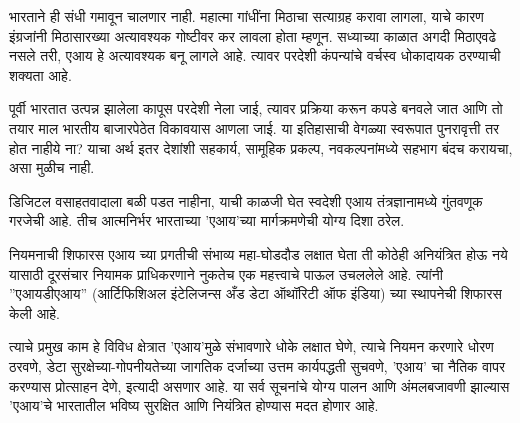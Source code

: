 भारताने ही संधी गमावून चालणार नाही. महात्मा गांधींना मिठाचा सत्याग्रह करावा लागला, याचे कारण इंग्रजांनी मिठासारख्या अत्यावश्यक गोष्टीवर कर लावला होता म्हणून. सध्याच्या काळात अगदी मिठाएवढे नसले तरी, एआय हे अत्यावश्यक बनू लागले आहे. त्यावर परदेशी कंपन्यांचे वर्चस्व धोकादायक ठरण्याची शक्यता आहे.

पूर्वी भारतात उत्पन्न झालेला कापूस परदेशी नेला जाई, त्यावर प्रक्रिया करून कपडे बनवले जात आणि तो तयार माल भारतीय बाजारपेठेत विकावयास आणला जाई. या इतिहासाची वेगळ्या स्वरूपात पुनरावृत्ती तर होत नाहीये ना? याचा अर्थ इतर देशांशी सहकार्य, सामूहिक प्रकल्प, नवकल्पनांमध्ये सहभाग बंदच करायचा, असा मुळीच नाही.

डिजिटल वसाहतवादाला बळी पडत नाहीना, याची काळजी घेत स्वदेशी एआय तंत्रज्ञानामध्ये गुंतवणूक गरजेची आहे. तीच आत्मनिर्भर भारताच्या 'एआय'च्या मार्गक्रमणेची योग्य दिशा ठरेल.

नियमनाची शिफारस
एआय च्या प्रगतीची संभाव्य महा-घोडदौड लक्षात घेता ती कोठेही अनियंत्रित होऊ नये यासाठी दूरसंचार नियामक प्राधिकरणाने नुकतेच एक महत्त्वाचे पाऊल उचललेले आहे. त्यांनी ''एआयडीएआय'' (आर्टिफिशिअल इंटेलिजन्स अँड डेटा ऑथॉरिटी ऑफ इंडिया) च्या स्थापनेची शिफारस केली आहे.

त्याचे प्रमुख काम हे विविध क्षेत्रात 'एआय'मुळे संभावणारे धोके लक्षात घेणे, त्याचे नियमन करणारे धोरण ठरवणे, डेटा सुरक्षेच्या-गोपनीयतेच्या जागतिक दर्जाच्या उत्तम कार्यपद्धती सुचवणे, 'एआय' चा नैतिक वापर करण्यास प्रोत्साहन देणे, इत्यादी असणार आहे. या सर्व सूचनांचे योग्य पालन आणि अंमलबजावणी झाल्यास 'एआय'चे भारतातील भविष्य सुरक्षित आणि नियंत्रित होण्यास मदत होणार आहे.

